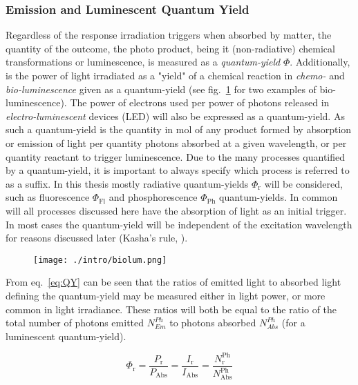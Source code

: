 			\subsubsection{Emission and Luminescent Quantum Yield}
			Regardless of the response irradiation triggers when absorbed by matter, the quantity of the outcome, the photo product, being it (non-radiative) chemical transformations or luminescence, is measured as a \emph{quantum-yield} $\Phi$. Additionally, is the power of light irradiated as a "yield" of a chemical reaction in \emph{chemo-} and \emph{bio-luminescence} given as a quantum-yield (see fig.~\ref{fig:biolum} for two examples of bio-luminescence). The power of electrons used per power of photons released in \emph{electro-luminescent} devices (LED) will also be expressed as a quantum-yield. As such a quantum-yield is the quantity in \unit{\mol} of any product formed by absorption or emission of light per quantity photons absorbed at a given wavelength, or per quantity reactant to trigger luminescence. Due to the many processes quantified by a quantum-yield, it is important to always specify which process is referred to as a suffix. In this thesis mostly radiative quantum-yields $\Phi_\mathrm{r}$ will be considered, such as fluorescence $\Phi_\mathrm{Fl}$ and phosphorescence $\Phi_\mathrm{Ph}$ quantum-yields. In common will all processes discussed here have the absorption of light as an initial trigger. In most cases the quantum-yield will be independent of the excitation wavelength for reasons discussed later (Kasha's rule, \pageref{kasha}).

			\begin{figure}[!h]
				\centering
				\label{fig:biolum}
				\texttt{[image: ./intro/biolum.png]}
				\caption{}
			\end{figure} 

			From eq.~\ref{eq:QY} can be seen that the ratios of emitted light to absorbed light defining the quantum-yield may be measured either in light power, or more common in light irradiance. These ratios will both be equal to the ratio of the total number of photons emitted $N_{Em}^{Ph}$ to photons absorbed $N_{Abs}^{Ph}$ (for a luminescent quantum-yield).

			\begin{equation}
				\label{eq:QY}
		 		\Phi_\mathrm{r} = \frac{P_\mathrm{r}}{P_\mathrm{Abs}} = \frac{I_\mathrm{r}}{I_\mathrm{Abs}} = \frac{N_\mathrm{r}^\mathrm{Ph}}{N_\mathrm{Abs}^\mathrm{Ph}}
			\end{equation}

